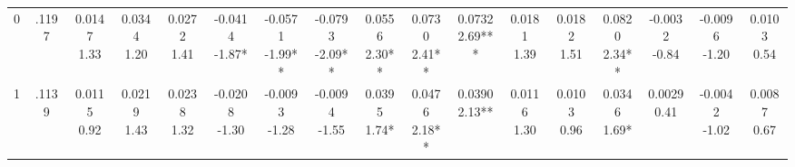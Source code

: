 \begin{landscape}
\begin{center}
{\begin{adjustbox}{max width=\textheight}
\begin{tabular}{lcccccccccccccccc}
0 & .1197 & \shortstack{0.0147\\1.33} & \shortstack{0.0344\\1.20} & \shortstack{0.0272\\1.41} & \shortstack{-0.0414\\-1.87*} & \shortstack{-0.0571\\-1.99**} & \shortstack{-0.0793\\-2.09**} & \shortstack{0.0556\\2.30**} & \shortstack{0.0730\\2.41**} & \shortstack{0.0732\\2.69***} & \shortstack{0.0181\\1.39} & \shortstack{0.0182\\1.51} & \shortstack{0.0820\\2.34**} & \shortstack{-0.0032\\-0.84} & \shortstack{-0.0096\\-1.20} & \shortstack{0.0103\\0.54} \\
1 & .1139 & \shortstack{0.0115\\0.92} & \shortstack{0.0219\\1.43} & \shortstack{0.0238\\1.32} & \shortstack{-0.0208\\-1.30} & \shortstack{-0.0093\\-1.28} & \shortstack{-0.0094\\-1.55} & \shortstack{0.0395\\1.74*} & \shortstack{0.0476\\2.18**} & \shortstack{0.0390\\2.13**} & \shortstack{0.0116\\1.30} & \shortstack{0.0103\\0.96} & \shortstack{0.0346\\1.69*} & \shortstack{0.0029\\0.41} & \shortstack{-0.0042\\-1.02} & \shortstack{0.0087\\0.67} \\

\end{tabular}
\end{adjustbox}}
\end{center}
\end{landscape}
